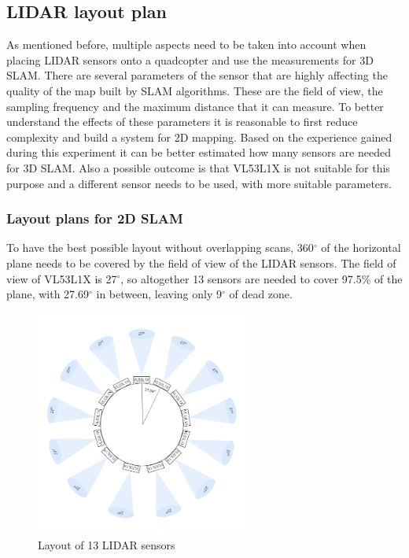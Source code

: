 \subsection{LIDAR layout plan}
As mentioned before, multiple aspects need to be taken into account when placing LIDAR sensors onto a
quadcopter and use the measurements for 3D SLAM. There are several parameters of the sensor that are 
highly affecting the quality of the map built by SLAM algorithms. These are the field of view, the 
sampling frequency and the maximum distance that it can measure. To better understand the effects of
these parameters it is reasonable to first reduce complexity and build a system for 2D mapping. Based on 
the experience gained during this experiment it can be better estimated how many sensors are needed for
3D SLAM. Also a possible outcome is that VL53L1X is not suitable for this purpose and a different
sensor needs to be used, with more suitable parameters.

\subsubsection{Layout plans for 2D SLAM}
To have the best possible layout without overlapping scans, 360$^{\circ}$ of the horizontal plane 
needs to be covered by the field of view of the LIDAR sensors. The field of view of VL53L1X is 27$^{\circ}$,
so altogether 13 sensors are needed to cover 97.5\% of the plane, with 27.69$^{\circ}$ in between, leaving
only 9$^{\circ}$ of dead zone.

\begin{figure}[h]
    \centering
    \includegraphics[width=70mm, keepaspectratio]{figures/2d_slam_13sensors.png}
    \caption{Layout of 13 LIDAR sensors}
    \label{fig:2d_13sensor_layout}
\end{figure}

